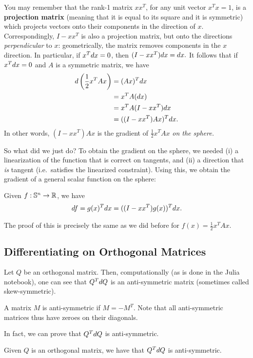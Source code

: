 You may remember that the rank-1 matrix $x x^T$, for any unit vector $x^T x = 1$, is a \textbf{projection matrix} (meaning that it is equal to its square and it is symmetric) which projects vectors onto their components in the direction of $x$.  Correspondingly, $I - x x^T$ is also a projection matrix, but onto the directions \emph{perpendicular} to $x$: geometrically, the matrix removes components in the $x$ direction. In particular, if $x^T d x= 0$, then $(I - x x^T) d x = d x.$ It follows that if $x^T d x = 0$ and $A$ is a symmetric matrix, we have 
\begin{align*}
    d \left(\frac{1}{2} x^T A x\right) &= (A x)^T d x \\
    &= x^T A (d x) \\
    &= x^T A ( I - x x^T) d x  \\
    &= ((I - x x^T) A x )^T d x.
\end{align*}
In other words, $(I - x x^T)A x$ is the gradient of $\frac{1}{2} x^T A x$ \textit{on the sphere.}

So what did we just do? To obtain the gradient on the sphere, we needed (i) a linearization of the function that is correct on tangents, and (ii) a direction that \textit{is} tangent (i.e.~satisfies the linearized constraint). Using this, we obtain the gradient of a general scalar function on the sphere:

\begin{theorem}
    Given $f: \mathbb{S}^n \to \mathbb R$, we have 
    \[
    d f = g(x)^T d x = (( I - x x^T) g(x))^T d x.
    \]
\end{theorem}

The proof of this is precisely the same as we did before for $f(x) = \frac{1}{2} x^T A x$.

\subsection{Differentiating on Orthogonal Matrices}

Let $Q$ be an orthogonal matrix. Then, computationally (as is done in the Julia notebook), one can see that $Q^T d Q$ is an anti-symmetric matrix (sometimes called skew-symmetric). 
\begin{definition}
A matrix $M$ is anti-symmetric if $M = - M^T$. Note that all anti-symmetric matrices thus have zeroes on their diagonals.
\end{definition}

In fact, we can prove that $Q^T d Q$ is anti-symmetric.
\begin{theorem}
    Given $Q$ is an orthogonal matrix, we have that $Q^T d Q$ is anti-symmetric.
\end{theorem}

